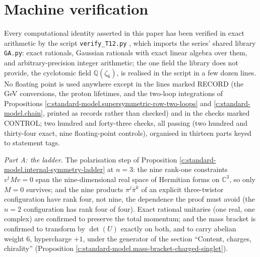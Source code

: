 \documentclass[11pt]{article}
\theoremstyle{definition}
\theoremstyle{plain}
\providecommand{\C}{}\renewcommand{\C}{\mathbb{C}}
\begin{document}
\section{Machine verification}

\label{c:note.standard-model.setting-machine-verification}
Every computational identity asserted in this paper has been verified in exact arithmetic by the script \texttt{verify\_T12.py} \cite{ButlerVerifyT12}, which imports the series' shared library \texttt{GA.py}: exact rationals, Gaussian rationals with exact linear algebra over them, and arbitrary-precision integer arithmetic; the one field the library does not provide, the cyclotomic field $\mathbb{Q}(\zeta_{6})$, is realised in the script in a few dozen lines. No floating point is used anywhere except in the lines marked RECORD (the GeV conversions, the proton lifetimes, and the two-loop integrations of Propositions \ref{c:standard-model.supersymmetric-row-two-loops} and \ref{c:standard-model.chain}, printed as records rather than checked) and in the checks marked CONTROL; two hundred and forty-three checks, all passing (two hundred and thirty-four exact, nine floating-point controls), organised in thirteen parts keyed to statement tags.

\emph{Part A: the ladder.} The polarisation step of Proposition \ref{c:standard-model.internal-symmetry-ladder} at $n = 3$: the nine rank-one constraints $v^{\dagger}Mv = 0$ span the nine-dimensional real space of Hermitian forms on $\C^{3}$, so only $M = 0$ survives; and the nine products $\pi^{j}\bar\pi^{k}$ of an explicit three-twistor configuration have rank four, not nine, the dependence the proof must avoid (the $n = 2$ configuration has rank four of four). Exact rational unitaries (one real, one complex) are confirmed to preserve the total momentum; and the mass bracket is confirmed to transform by $\det(U)$ exactly on both, and to carry abelian weight $6$, hypercharge $+1$, under the generator of the section ``Content, charges, chirality'' (Proposition \ref{c:standard-model.mass-bracket-charged-singlet}).
\end{document}
